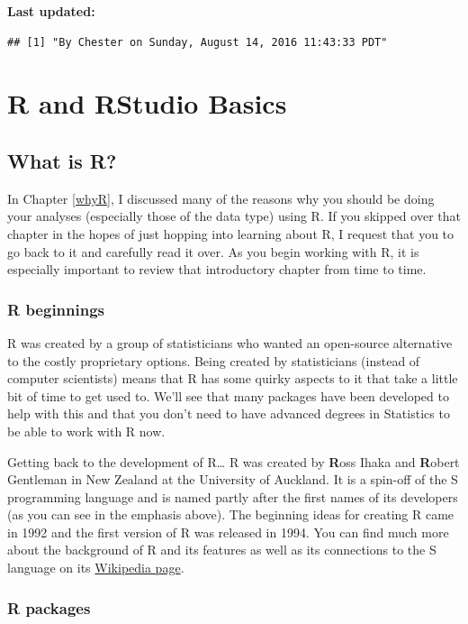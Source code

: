 \documentclass[]{tufte-book}
\begin{document}
\textbf{Last updated:}

\begin{verbatim}
## [1] "By Chester on Sunday, August 14, 2016 11:43:33 PDT"
\end{verbatim}

\chapter{R and RStudio Basics}\label{rstudiobasics}

\section{What is R?}\label{what-is-r}

In Chapter \ref{whyR}, I discussed many of the reasons why you should be
doing your analyses (especially those of the data type) using R. If you
skipped over that chapter in the hopes of just hopping into learning
about R, I request that you to go back to it and carefully read it over.
As you begin working with R, it is especially important to review that
introductory chapter from time to time.

\subsection{R beginnings}\label{r-beginnings}

R was created by a group of statisticians who wanted an open-source
alternative to the costly proprietary options. Being created by
statisticians (instead of computer scientists) means that R has some
quirky aspects to it that take a little bit of time to get used to.
We'll see that many packages have been developed to help with this and
that you don't need to have advanced degrees in Statistics to be able to
work with R now.

Getting back to the development of R\ldots{} R was created by
\textbf{R}oss Ihaka and \textbf{R}obert Gentleman in New Zealand at the
University of Auckland. It is a spin-off of the S programming language
and is named partly after the first names of its developers (as you can
see in the emphasis above). The beginning ideas for creating R came in
1992 and the first version of R was released in 1994. You can find much
more about the background of R and its features as well as its
connections to the S language on its
\href{https://en.wikipedia.org/wiki/R_(programming_language)}{Wikipedia
page}.

\subsection{R packages}\label{r-packages}
\end{document}
